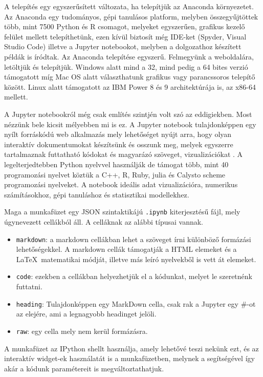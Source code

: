 
    A telepítés egy egyszerűsített változata, ha telepítjük az Anaconda
környezetet. Az Anaconda egy tudományos, gépi tanulásos platform,
melyben összegyűjtöttek több, mint 7500 Python és R csomagot, melyeket
egyszerűen, grafikus kezelő felület mellett telepíthetünk, ezen kívül
biztosít még IDE-ket (Spyder, Visual Studio Code) illetve a Jupyter
notebookot, melyben a dolgozathoz készített példák is íródtak. Az Anaconda telepítése
egyszerű. Felmegyünk a weboldalára, letöltjük és telepítjük.
Windows
alatt mind a 32, mind pedig a 64 bites verzió támogatott míg Mac OS alatt
választhatunk grafikus vagy parancssoros telepítő között.
Linux alatt támogatott az IBM Power 8 és 9 architektúrája is, az x86-64
mellett.


A Jupyter notebookról még csak említés szintjén volt szó az eddigiekben. Most nézzünk
bele kicsit mélyebben mi is ez. A Jupyter notebook tulajdonképpen egy
nyílt forráskódú web alkalmazás mely lehetőséget nyújt arra, hogy olyan
interaktív dokumentumokat készítsünk és osszunk meg, melyek egyszerre
tartalmaznak futtatható kódokat és magyarázó szöveget, vizualizációkat \cite{jupyter}.
A legelterjedtebben Python nyelvvel használják de támogat több, mint 40
programozási nyelvet köztük a C++, R, Ruby, julia és Calysto scheme
programozási nyelveket.
A notebook ideális adat vizualizációra,
numerikus számításokhoz, gépi tanuláshoz és statisztikai modellekhez.

Maga a munkafüzet egy JSON szintaktikájú \texttt{.ipynb} kiterjesztésű fájl, mely
úgynevezett cellákból áll. A celláknak az alábbi típusai vannak.
\begin{itemize}
\item \texttt{markdown}: a markdown cellákban lehet a szöveget írni különböző
formázási lehetőségekkel. A markdown cellák támogatják a HTML elemeket
és a \LaTeX\ matematikai módját, illetve más leíró nyelvekből is vett át
elemeket.
\item \texttt{code}: ezekben a cellákban helyezhetjük el a
kódunkat, melyet le szeretnénk futtatni.
\item \texttt{heading}:
Tulajdonképpen egy MarkDown cella, csak rak a Jupyter egy \#-ot az
elejére, ami a legnagyobb headinget jelöli.
\item \texttt{raw}: egy cella mely
nem kerül formázásra.
\end{itemize}
A munkafüzet az IPython shellt használja, amely lehetővé teszi nekünk
ezt, és az interaktív widget-ek használatát is a munkafüzetben, melynek a
segítségével így akár a kódunk paramétereit is megváltoztathatjuk.
